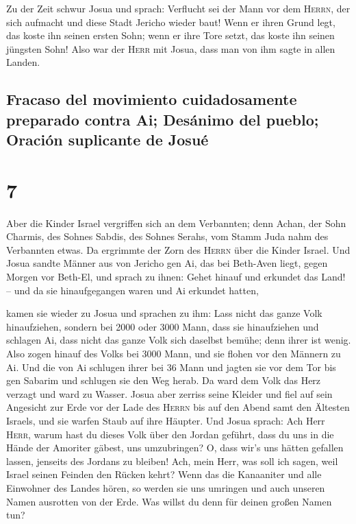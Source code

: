  Zu der Zeit schwur Josua und sprach: Verflucht sei der
Mann vor dem \textsc{Herrn}, der sich aufmacht und diese Stadt Jericho
wieder baut! Wenn er ihren Grund legt, das koste ihn seinen ersten Sohn;
wenn er ihre Tore setzt, das koste ihn seinen jüngsten Sohn!
 Also war der \textsc{Herr} mit Josua, dass man von ihm
sagte in allen Landen.

\hypertarget{fracaso-del-movimiento-cuidadosamente-preparado-contra-ai-desuxe1nimo-del-pueblo-oraciuxf3n-suplicante-de-josuuxe9}{%
\subsection{Fracaso del movimiento cuidadosamente preparado contra Ai;
Desánimo del pueblo; Oración suplicante de
Josué}\label{fracaso-del-movimiento-cuidadosamente-preparado-contra-ai-desuxe1nimo-del-pueblo-oraciuxf3n-suplicante-de-josuuxe9}}

\hypertarget{section-6}{%
\section{7}\label{section-6}}

 Aber die Kinder Israel vergriffen sich an dem Verbannten;
denn Achan, der Sohn Charmis, des Sohnes Sabdis, des Sohnes Serahs, vom
Stamm Juda nahm des Verbannten etwas. Da ergrimmte der Zorn des
\textsc{Herrn} über die Kinder Israel.  Und Josua sandte
Männer aus von Jericho gen Ai, das bei Beth-Aven liegt, gegen Morgen vor
Beth-El, und sprach zu ihnen: Gehet hinauf und erkundet das Land! -- und
da sie hinaufgegangen waren und Ai erkundet hatten,

 kamen sie wieder zu Josua und sprachen zu ihm: Lass nicht
das ganze Volk hinaufziehen, sondern bei 2000 oder 3000 Mann, dass sie
hinaufziehen und schlagen Ai, dass nicht das ganze Volk sich daselbst
bemühe; denn ihrer ist wenig.  Also zogen hinauf des Volks
bei 3000 Mann, und sie flohen vor den Männern zu Ai.  Und
die von Ai schlugen ihrer bei 36 Mann und jagten sie vor dem Tor bis gen
Sabarim und schlugen sie den Weg herab. Da ward dem Volk das Herz
verzagt und ward zu Wasser.  Josua aber zerriss seine
Kleider und fiel auf sein Angesicht zur Erde vor der Lade des
\textsc{Herrn} bis auf den Abend samt den Ältesten Israels, und sie
warfen Staub auf ihre Häupter.  Und Josua sprach: Ach Herr
\textsc{Herr}, warum hast du dieses Volk über den Jordan geführt, dass
du uns in die Hände der Amoriter gäbest, uns umzubringen? O, dass wir's
uns hätten gefallen lassen, jenseits des Jordans zu bleiben!
 Ach, mein Herr, was soll ich sagen, weil Israel seinen
Feinden den Rücken kehrt?  Wenn das die Kanaaniter und
alle Einwohner des Landes hören, so werden sie uns umringen und auch
unseren Namen ausrotten von der Erde. Was willst du denn für deinen
großen Namen tun?

